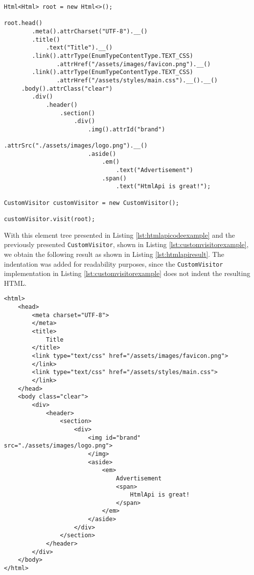 \begin{minipage}{\linewidth}
\begin{lstlisting}[caption={HtmlApi - The Definition of the Element Tree},label={lst:htmlapicodeexample}]
Html<Html> root = new Html<>();

root.head()
        .meta().attrCharset("UTF-8").__()
        .title()
            .text("Title").__()
        .link().attrType(EnumTypeContentType.TEXT_CSS)
               .attrHref("/assets/images/favicon.png").__()
        .link().attrType(EnumTypeContentType.TEXT_CSS)
               .attrHref("/assets/styles/main.css").__().__()
     .body().attrClass("clear")
        .div()
            .header()
                .section()
                    .div()
                        .img().attrId("brand")
                              .attrSrc("./assets/images/logo.png").__()
                        .aside()
                            .em()
                                .text("Advertisement")
                            .span()
                                .text("HtmlApi is great!");
                                    
CustomVisitor customVisitor = new CustomVisitor();
    
customVisitor.visit(root);
\end{lstlisting}
\end{minipage}

\noindent
With this element tree presented in Listing \ref{lst:htmlapicodeexample} and the previously presented \texttt{CustomVisitor}, shown in Listing \ref{lst:customvisitorexample}, we obtain the following result as shown in Listing \ref{lst:htmlapiresult}. The indentation was added for readability purposes, since the \texttt{CustomVisitor} implementation in Listing \ref{lst:customvisitorexample} does not indent the resulting \ac{HTML}.

\bigskip


\begin{minipage}{\linewidth}
\begin{lstlisting}[caption={HtmlApi - The Result of the Element Tree Visit},label={lst:htmlapiresult}]
<html>
    <head>
        <meta charset="UTF-8">
        </meta>
        <title>
            Title
        </title>
        <link type="text/css" href="/assets/images/favicon.png">
        </link>
        <link type="text/css" href="/assets/styles/main.css">
        </link>
    </head>
    <body class="clear">
        <div>
            <header>
                <section>
                    <div>
                        <img id="brand" src="./assets/images/logo.png">
                        </img>
                        <aside>
                            <em>
                                Advertisement
                                <span>
                                    HtmlApi is great!
                                </span>
                            </em>
                        </aside>
                    </div>
                </section>
            </header>
        </div>
    </body>
</html>                          
\end{lstlisting}
\end{minipage}

